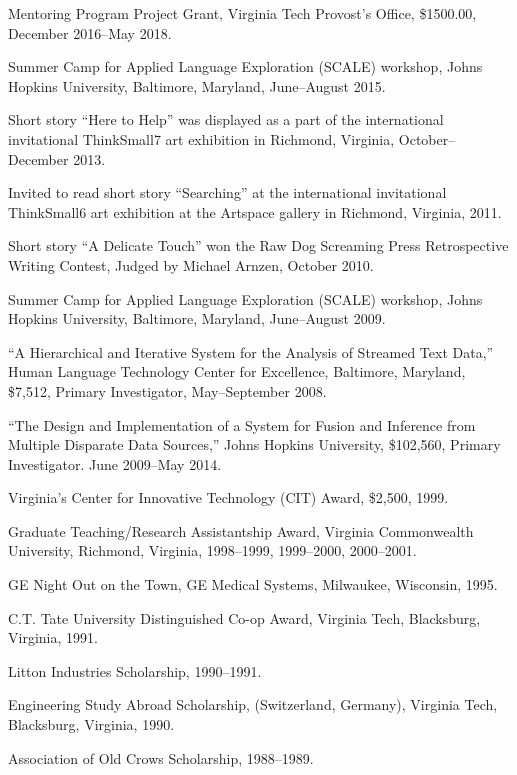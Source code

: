 \documentclass[11pt,article,oneside]{memoir}
\begin{document}
\bigskip


\ind Mentoring Program Project Grant, Virginia Tech Provost's Office, \$1500.00, December 2016--May 2018.

\ind Summer Camp for Applied Language Exploration (SCALE) workshop, Johns Hopkins University, Baltimore, Maryland, June--August 2015.

\ind Short story “Here to Help” was displayed as a part of the international invitational ThinkSmall7 art exhibition in Richmond, Virginia, October--December 2013.

\ind Invited to read short story “Searching” at the international invitational ThinkSmall6 art exhibition at the Artspace gallery in Richmond, Virginia, 2011.

\ind Short story “A Delicate Touch” won the Raw Dog Screaming Press Retrospective Writing Contest, Judged by Michael Arnzen, October 2010.

\ind Summer Camp for Applied Language Exploration (SCALE) workshop, Johns Hopkins University, Baltimore, Maryland, June--August 2009.

\ind “A Hierarchical and Iterative System for the Analysis of Streamed Text Data,” Human Language Technology Center for Excellence, Baltimore, Maryland, \$7,512, Primary Investigator, May--September 2008.

\ind “The Design and Implementation of a System for Fusion and Inference from Multiple Disparate Data Sources,” Johns Hopkins University, \$102,560, Primary Investigator.  June 2009--May 2014.

\ind Virginia’s Center for Innovative Technology (CIT) Award, \$2,500, 1999.

\ind Graduate Teaching/Research Assistantship Award, Virginia Commonwealth University, Richmond, Virginia, 1998--1999, 1999--2000, 2000--2001.

\ind GE Night Out on the Town, GE Medical Systems, Milwaukee, Wisconsin, 1995.

\ind C.T. Tate University Distinguished Co-op Award, Virginia Tech, Blacksburg, Virginia, 1991.

\ind Litton Industries Scholarship, 1990--1991.

\ind Engineering Study Abroad Scholarship, (Switzerland, Germany), Virginia Tech, Blacksburg, Virginia, 1990.

\ind Association of Old Crows Scholarship, 1988--1989.






\end{document}

